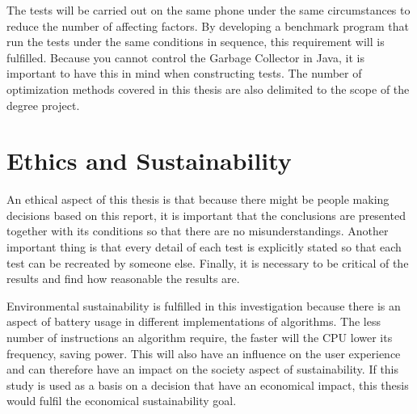 The tests will be carried out on the same phone under the same circumstances to reduce the number of affecting factors. By developing a benchmark program that run the tests under the same conditions in sequence, this requirement will is fulfilled. Because you cannot control the Garbage Collector in Java, it is important to have this in mind when constructing tests. The number of optimization methods covered in this thesis are also delimited to the scope of the degree project.

\section{Ethics and Sustainability}
An ethical aspect of this thesis is that because there might be people making decisions based on this report, it is important that the conclusions are presented together with its conditions so that there are no misunderstandings. Another important thing is that every detail of each test is explicitly stated so that each test can be recreated by someone else. Finally, it is necessary to be critical of the results and find how reasonable the results are.

Environmental sustainability is fulfilled in this investigation because there is an aspect of battery usage in different implementations of algorithms. The less number of instructions an algorithm require, the faster will the CPU lower its frequency, saving power. This will also have an influence on the user experience and can therefore have an impact on the society aspect of sustainability. If this study is used as a basis on a decision that have an economical impact, this thesis would fulfil the economical sustainability goal.

